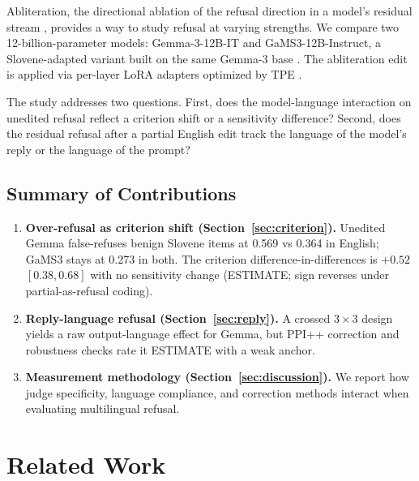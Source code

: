 \documentclass[11pt,letterpaper]{article}
\begin{document}
Abliteration, the directional ablation of the refusal direction in a model's residual stream \citep{Arditi2024}, provides a way to study refusal at varying strengths.
We compare two 12-billion-parameter models: Gemma-3-12B-IT and GaMS3-12B-Instruct, a Slovene-adapted variant built on the same Gemma-3 base \citep{Vres2026}.
The abliteration edit is applied via per-layer LoRA adapters \citep{Hu2021} optimized by TPE \citep{Akiba2019}.

The study addresses two questions.
First, does the model-language interaction on unedited refusal reflect a criterion shift or a sensitivity difference?
Second, does the residual refusal after a partial English edit track the language of the model's reply or the language of the prompt?

\subsection*{Summary of Contributions}

\begin{enumerate}
\item \textbf{Over-refusal as criterion shift (Section~\ref{sec:criterion}).} Unedited Gemma false-refuses benign Slovene items at 0.569 vs 0.364 in English; GaMS3 stays at 0.273 in both.
The criterion difference-in-differences is $+0.52$ $[0.38, 0.68]$ with no sensitivity change (ESTIMATE; sign reverses under partial-as-refusal coding).
\item \textbf{Reply-language refusal (Section~\ref{sec:reply}).} A crossed $3{\times}3$ design yields a raw output-language effect for Gemma, but PPI++ correction and robustness checks rate it ESTIMATE with a weak anchor.
\item \textbf{Measurement methodology (Section~\ref{sec:discussion}).} We report how judge specificity, language compliance, and correction methods interact when evaluating multilingual refusal.
\end{enumerate}

\section{Related Work}
\end{document}
